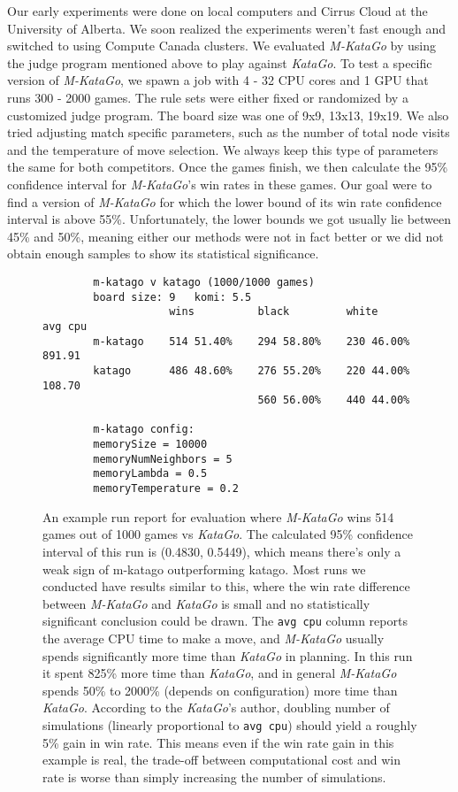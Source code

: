 \documentclass{article}
\newcommand{\katago}{\emph{KataGo}\xspace}
\newcommand{\mkatago}{\emph{M-KataGo}\xspace}
\begin{document}
Our early experiments were done on local computers and Cirrus Cloud at the University of Alberta.
We soon realized the experiments weren't fast enough and switched to using Compute Canada clusters.
We evaluated \mkatago by using the judge program mentioned above to play against \katago.
To test a specific version of \mkatago, we spawn a job with 4 - 32 CPU cores and 1 GPU that runs 300 - 2000 games.
The rule sets were either fixed or randomized by a customized judge program.
The board size was one of 9x9, 13x13, 19x19.
We also tried adjusting match specific parameters, such as the number of total node visits and the temperature of move selection.
We always keep this type of parameters the same for both competitors.
Once the games finish, we then calculate the 95\% confidence interval for \mkatago's win rates in these games.
Our goal were to find a version of \mkatago for which the lower bound of its win rate confidence interval is above 55\%.
Unfortunately, the lower bounds we got usually lie between 45\% and 50\%, meaning either our methods were not in fact better or we did not obtain enough samples to show its statistical significance.

\begin{figure}
    \begin{verbatim}
        m-katago v katago (1000/1000 games)
        board size: 9   komi: 5.5
                    wins          black         white         avg cpu
        m-katago    514 51.40%    294 58.80%    230 46.00%    891.91
        katago      486 48.60%    276 55.20%    220 44.00%    108.70
                                  560 56.00%    440 44.00%
        
        m-katago config:
        memorySize = 10000
        memoryNumNeighbors = 5
        memoryLambda = 0.5
        memoryTemperature = 0.2
    \end{verbatim}
    \captionsetup{width=.8\linewidth}
    \caption{
        An example run report for evaluation where \mkatago wins 514 games out of 1000 games vs \katago.
        The calculated 95\% confidence interval  of this run is (0.4830, 0.5449), which means there's only a weak sign of m-katago outperforming katago.
        Most runs we conducted have results similar to this, where the win rate difference between \mkatago and \katago is small and no statistically significant conclusion could be drawn.
        The \texttt{avg cpu} column reports the average CPU time to make a move, and \mkatago usually spends significantly more time than \katago in planning.
        In this run it spent 825\% more time than \katago, and in general \mkatago spends 50\% to 2000\% (depends on configuration) more time than \katago.
        According to the \katago's author, doubling number of simulations (linearly proportional to \texttt{avg cpu}) should yield a roughly 5\% gain in win rate.
        This means even if the win rate gain in this example is real, the trade-off between computational cost and win rate is worse than simply increasing the number of simulations.
    }
\end{figure}
\end{document}
